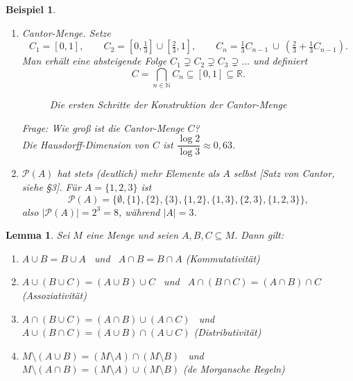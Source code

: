\documentclass[a4paper]{article}
\theoremstyle{kurzskript}
\newtheorem{lemma}[satz]{Lemma}
\newtheorem{beispiel}[satz]{Beispiel}
\newcommand{\N}{\mathbb{N}}
\newcommand{\R}{\mathbb{R}}
\newcommand{\Pot}{\mathcal{P}}
\begin{document}
\begin{beispiel}
\leavevmode
\begin{enumerate}
  \item \emph{Cantor-Menge.} Setze
  \[
    C_1 = [0, 1], \qquad C_2 = \left[0, \tfrac13\right] \cup \left[\tfrac23, 1\right], \qquad
    C_n = \tfrac13 C_{n-1} \ \cup\ \left(\tfrac23 + \tfrac13 C_{n-1}\right).
  \]
  Man erhält eine absteigende Folge $C_1 \supsetneq C_2 \supsetneq C_3 \supsetneq \dots$ und definiert
  \[
    C = \bigcap_{n \in \N} C_n \subseteq [0, 1] \subseteq \R.
  \]

  \begin{figure}[H]
  \centering
  \caption{Die ersten Schritte der Konstruktion der Cantor-Menge}
  \end{figure}

  \emph{Frage:} Wie groß ist die Cantor-Menge $C$? \\
  Die Hausdorff-Dimension von $C$ ist $\dfrac{\log 2}{\log 3} \approx 0{,}63$.

  \item $\Pot(A)$ hat stets (deutlich) mehr Elemente als $A$ selbst [Satz von Cantor, siehe §3]. Für $A = \{1, 2, 3\}$ ist
  \[
    \Pot(A) = \bigl\{ \emptyset, \{1\}, \{2\}, \{3\}, \{1, 2\}, \{1, 3\}, \{2, 3\}, \{1, 2, 3\} \bigr\},
  \]
  also $|\Pot(A)| = 2^3 = 8$, während $|A| = 3$.
\end{enumerate}
\end{beispiel}

\begin{lemma}
Sei $M$ eine Menge und seien $A, B, C \subseteq M$. Dann gilt:
\begin{enumerate}[label=(\alph*)]
  \item $A \cup B = B \cup A$ \ und \ $A \cap B = B \cap A$ \hfill (Kommutativität)
  \item $A \cup (B \cup C) = (A \cup B) \cup C$ \ und \ $A \cap (B \cap C) = (A \cap B) \cap C$ \hfill (Assoziativität)
  \item $A \cap (B \cup C) = (A \cap B) \cup (A \cap C)$ \ und \ $A \cup (B \cap C) = (A \cup B) \cap (A \cup C)$ \hfill (Distributivität)
  \item $M \setminus (A \cup B) = (M \setminus A) \cap (M \setminus B)$ \ und \ $M \setminus (A \cap B) = (M \setminus A) \cup (M \setminus B)$ \hfill (de Morgansche Regeln)
\end{enumerate}
\end{lemma}
\end{document}
